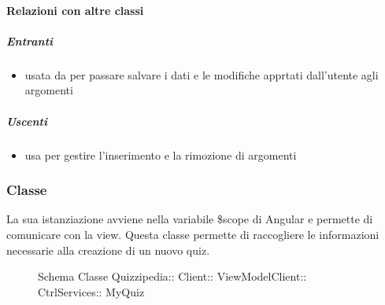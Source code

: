 \paragraph{Relazioni con altre classi}
\subparagraph{Entranti}
\begin{itemize}
\item usata da  per passare salvare i dati e le modifiche apprtati dall'utente agli argomenti
\end{itemize}
\subparagraph{Uscenti}
\begin{itemize}
\item usa  per gestire l'inserimento e la rimozione di argomenti
\end{itemize}
\subsubsection{Classe }
La sua istanziazione avviene nella variabile \$scope di Angular e permette di comunicare con la view. Questa classe permette di raccogliere le informazioni necessarie alla creazione di un nuovo quiz.
\begin{figure}[H]
\centering
\noindent{}
\caption[Schema Classe MyQuiz]{Schema Classe Quizzipedia:: Client:: ViewModelClient:: CtrlServices:: MyQuiz}
\end{figure}

